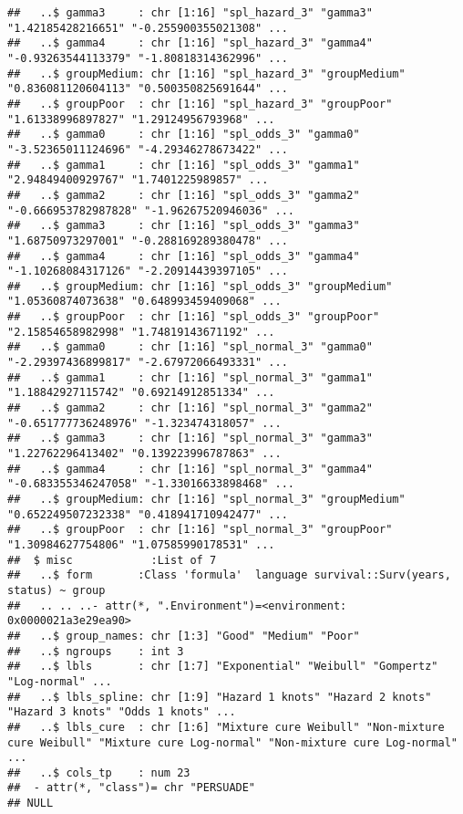 \documentclass[
]{article}
\begin{document}
\begin{verbatim}
##   ..$ gamma3     : chr [1:16] "spl_hazard_3" "gamma3" "1.42185428216651" "-0.255900355021308" ...
##   ..$ gamma4     : chr [1:16] "spl_hazard_3" "gamma4" "-0.93263544113379" "-1.80818314362996" ...
##   ..$ groupMedium: chr [1:16] "spl_hazard_3" "groupMedium" "0.836081120604113" "0.500350825691644" ...
##   ..$ groupPoor  : chr [1:16] "spl_hazard_3" "groupPoor" "1.61338996897827" "1.29124956793968" ...
##   ..$ gamma0     : chr [1:16] "spl_odds_3" "gamma0" "-3.52365011124696" "-4.29346278673422" ...
##   ..$ gamma1     : chr [1:16] "spl_odds_3" "gamma1" "2.94849400929767" "1.7401225989857" ...
##   ..$ gamma2     : chr [1:16] "spl_odds_3" "gamma2" "-0.666953782987828" "-1.96267520946036" ...
##   ..$ gamma3     : chr [1:16] "spl_odds_3" "gamma3" "1.68750973297001" "-0.288169289380478" ...
##   ..$ gamma4     : chr [1:16] "spl_odds_3" "gamma4" "-1.10268084317126" "-2.20914439397105" ...
##   ..$ groupMedium: chr [1:16] "spl_odds_3" "groupMedium" "1.05360874073638" "0.648993459409068" ...
##   ..$ groupPoor  : chr [1:16] "spl_odds_3" "groupPoor" "2.15854658982998" "1.74819143671192" ...
##   ..$ gamma0     : chr [1:16] "spl_normal_3" "gamma0" "-2.29397436899817" "-2.67972066493331" ...
##   ..$ gamma1     : chr [1:16] "spl_normal_3" "gamma1" "1.18842927115742" "0.69214912851334" ...
##   ..$ gamma2     : chr [1:16] "spl_normal_3" "gamma2" "-0.651777736248976" "-1.323474318057" ...
##   ..$ gamma3     : chr [1:16] "spl_normal_3" "gamma3" "1.22762296413402" "0.139223996787863" ...
##   ..$ gamma4     : chr [1:16] "spl_normal_3" "gamma4" "-0.683355346247058" "-1.33016633898468" ...
##   ..$ groupMedium: chr [1:16] "spl_normal_3" "groupMedium" "0.652249507232338" "0.418941710942477" ...
##   ..$ groupPoor  : chr [1:16] "spl_normal_3" "groupPoor" "1.30984627754806" "1.07585990178531" ...
##  $ misc            :List of 7
##   ..$ form       :Class 'formula'  language survival::Surv(years, status) ~ group
##   .. .. ..- attr(*, ".Environment")=<environment: 0x0000021a3e29ea90> 
##   ..$ group_names: chr [1:3] "Good" "Medium" "Poor"
##   ..$ ngroups    : int 3
##   ..$ lbls       : chr [1:7] "Exponential" "Weibull" "Gompertz" "Log-normal" ...
##   ..$ lbls_spline: chr [1:9] "Hazard 1 knots" "Hazard 2 knots" "Hazard 3 knots" "Odds 1 knots" ...
##   ..$ lbls_cure  : chr [1:6] "Mixture cure Weibull" "Non-mixture cure Weibull" "Mixture cure Log-normal" "Non-mixture cure Log-normal" ...
##   ..$ cols_tp    : num 23
##  - attr(*, "class")= chr "PERSUADE"
## NULL
\end{verbatim}

\clearpage
\end{document}
